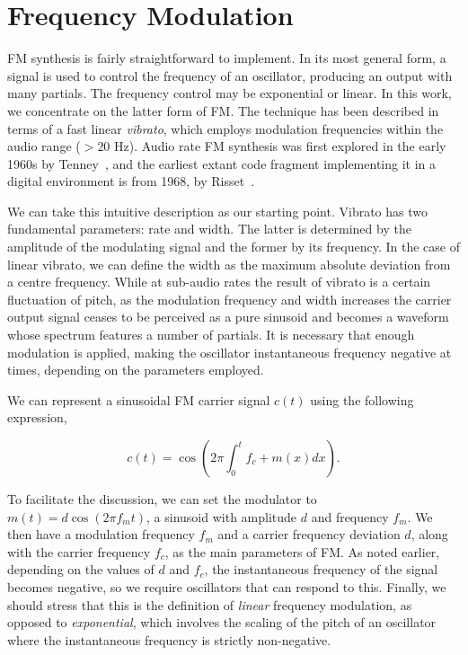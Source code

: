 \documentclass[]{interact}
\begin{document}
\section{Frequency Modulation}
FM synthesis is fairly straightforward to implement. In its most general form, a signal is used to control the frequency of an oscillator, producing an output with many partials. The frequency control may be exponential or linear. In this work, we concentrate on the latter form of FM. The technique has been described in terms of a fast linear \emph{vibrato}, which employs modulation frequencies within the audio range ($> 20$ Hz).  Audio rate FM synthesis was first explored in the early 1960s by Tenney~\citep{Tenney1964}, and the earliest extant code fragment implementing it in a digital environment is from 1968, by Risset~\citep{Lazzarini2023}.

We can take this intuitive description as our starting point. Vibrato has two fundamental parameters: rate and width. The latter is determined by the amplitude of the modulating signal and the former by its frequency. In the case of linear vibrato, we can define the width as the maximum absolute deviation from a centre frequency. While at sub-audio rates the result of vibrato is a certain fluctuation of pitch, as the modulation frequency and width increases the carrier output signal ceases to be perceived as a pure sinusoid and becomes a waveform whose spectrum features a number of partials. It is necessary that enough modulation is applied, making the oscillator instantaneous frequency negative at times, depending on the parameters employed.

We can represent a sinusoidal FM carrier signal $c(t)$ using the following expression,

\begin{equation}\label{eq:fm}
c(t) = \cos\left(2\pi \int_{0}^{t} f_c + m(x) dx \right).
\end{equation}

To facilitate the discussion, we can set the modulator to $m(t) = d \cos(2\pi f_m t)$, a sinusoid with amplitude
$d$ and frequency $f_m$. We then have a modulation frequency $f_m$ and a carrier frequency deviation $d$,
along with the carrier frequency $f_c$, as the main parameters of FM. As noted earlier, depending on the values of $d$ and $f_c$,
the instantaneous frequency of the signal becomes negative, so we require oscillators that can respond to this. 
Finally, we should stress that this is the definition of \emph{linear} frequency modulation, as opposed to \emph{exponential}, which involves the scaling of the pitch of an oscillator where the instantaneous frequency is strictly non-negative.
\end{document}
